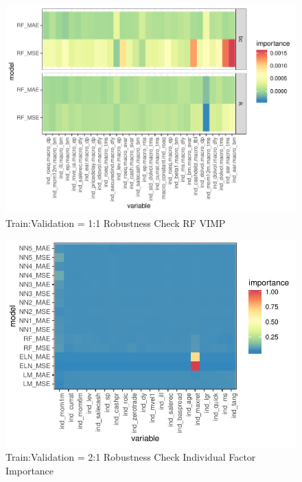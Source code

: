 \documentclass{article}
\begin{document}

\begin{figure}
	\includegraphics[]{../../Results/empirical_train_valid_1/empirical_vimp.pdf}
	\caption{{Train:Validation = 1:1 Robustness Check RF VIMP}}
\end{figure}





\FloatBarrier


\begin{figure}
	\includegraphics[]{../../Results/empirical_train_valid_2/empirical_all_sample_vi_ind.pdf}
	\caption{Train:Validation = 2:1 Robustness Check Individual Factor Importance}
\end{figure}
\end{document}
